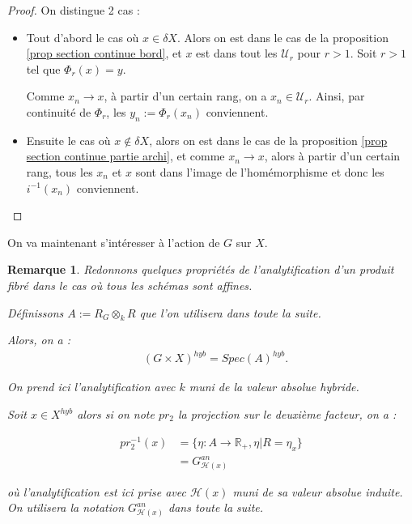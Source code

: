 \documentclass[11pt]{article}
\newcommand{\R}{\mathbb{R}}
\newcommand{\h}{\mathcal{H}}
\newtheorem{defi}[thm]{Définition}
\newtheorem{rem}[thm]{Remarque}
\begin{document}
\begin{proof}
On distingue 2 cas :
\begin{itemize}
\item Tout d'abord le cas où $x \in \delta X$. Alors on est dans le cas de la proposition \ref{prop section continue bord}, et $x$ est dans tout les $\mathcal{U}_r$ pour $r >1$. Soit $r>1$ tel que $\Phi_r(x) = y$.

Comme $x_n \rightarrow x$, à partir d'un certain rang, on a $x_n \in \mathcal{U}_r$. Ainsi, par continuité de $\Phi_r$, les $y_n := \Phi_r(x_n)$ conviennent. 

\item Ensuite le cas où $x\notin \delta X$, alors on est dans le cas de la proposition \ref{prop section continue partie archi}, et comme $x_n \rightarrow x$, alors à partir d'un certain rang, tous les $x_n$ et $x$ sont dans l'image de l'homémorphisme et donc les $i^{-1}(x_n)$ conviennent.
\end{itemize}
\end{proof}

On va maintenant s'intéresser à l'action de $G$ sur $X$. 

\begin{rem}
Redonnons quelques propriétés de l'analytification d'un produit fibré dans le cas où tous les schémas sont affines.

Définissons $A := R_G \otimes_k R$ que l'on utilisera dans toute la suite.

Alors, on a : 
\begin{align*}
&(G \times X)^{hyb} = Spec(A)^{hyb}.
\end{align*}

On prend ici l'analytification avec $k$ muni de la valeur absolue hybride.
 
Soit $x \in X^{hyb}$ alors si on note $pr_2$ la projection sur le deuxième facteur, on a :

\begin{align*}
pr_2^{-1}(x) &= \lbrace \eta : A \rightarrow \R_+, \eta|R = \eta_x\rbrace \\
&= G_{\mathcal{H}(x)}^{an}
\end{align*}

où l'analytification est ici prise avec $\mathcal{H}(x)$ muni de sa valeur absolue induite. On utilisera la notation $G^{an}_{\mathcal{H}(x)}$ dans toute la suite.
\end{rem}

\end{document}
